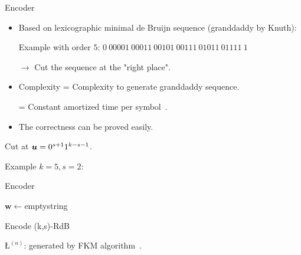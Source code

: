 \begin{frame}{Encoder}
    \begin{itemize}
        \item Based on lexicographic minimal de Bruijn sequence (granddaddy by Knuth):
        
        Example with order $5$: $0\ 00001\ 00011\ 00101\ 00111\ 01011\ 01111\ 1$
        
        $\rightarrow$ Cut the sequence at the "right place".
        \item Complexity = Complexity to generate granddaddy sequence.
        
        \hspace{1.8cm} = Constant amortized time per symbol~.
        \item The correctness can be proved easily.
    \end{itemize}
    \pause
    Cut at ${\boldsymbol u} = 0^{s+1}1^{k-s-1}$.
    
    \pause
    Example $k=5,s=2:$

    
    
\end{frame}

\begin{frame}{Encoder}
    \begin{algorithm}[H]
    \DontPrintSemicolon
        \BlankLine
        
        $\mathbf{w}\gets$emptystring\;
        \caption{Encode (k,s)-RdB}
        \label{alg:encoder}
    \end{algorithm}
    $\text{\L}^{(n)}$: generated by FKM algorithm~.
\end{frame}

